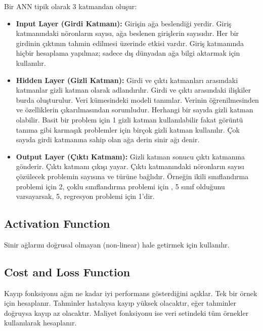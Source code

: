 Bir ANN tipik olarak 3 katmandan oluşur:

\begin{itemize}
    \item \textbf{Input Layer (Girdi Katmanı):} Girişin ağa beslendiği yerdir. Giriş katmanındaki nöronların sayısı, ağa beslenen girişlerin sayısıdır. Her bir girdinin çıktının tahmin edilmesi üzerinde etkisi vardır. Giriş katmanında hiçbir hesaplama yapılmaz; sadece dış dünyadan ağa bilgi aktarmak için kullanılır.
    \item \textbf{Hidden Layer (Gizli Katman):} Girdi ve çıktı katmanları arasındaki katmanlar gizli katman olarak adlandırılır. Girdi ve çıktı arasındaki ilişkiler burda oluşturulur. Veri kümesindeki modeli tanımlar. Verinin öğrenilmesinden ve özelliklerin çıkarılmasından sorumludur. Herhangi bir sayıda gizli katman olabilir. Basit bir problem için 1 gizli katman kullanılabilir fakat görüntü tanıma gibi karmaşık problemler için birçok gizli katman kullanılır. Çok sayıda girdi katmanına sahip olan ağa derin sinir ağı denir.
    \item \textbf{Output Layer (Çıktı Katmanı):} Gizli katman sonucu çıktı katmanına gönderir. Çıktı katmanı çıkışı yayar. Çıktı katmanındaki nöronların sayısı çözülecek problemin sayısına ve türüne bağlıdır. Örneğin ikili sınıflandırma problemi için 2, çoklu sınıflandırma problemi için , 5 sınıf olduğunu varsayarsak, 5, regresyon problemi için 1'dir.
\end{itemize}

\subsection{Activation Function}
Sinir ağlarını doğrusal olmayan (non-linear) hale getirmek için kullanılır.

\subsection{Cost and Loss Function}
Kayıp fonksiyonu ağın ne kadar iyi performans gösterdiğini açıklar. Tek bir örnek için hesaplanır. Tahminler hatalıysa kayıp yüksek olacaktır, eğer tahminler doğruysa kayıp az olacaktır. Maliyet fonksiyonu ise veri setindeki tüm örnekler kullanılarak hesaplanır. 

